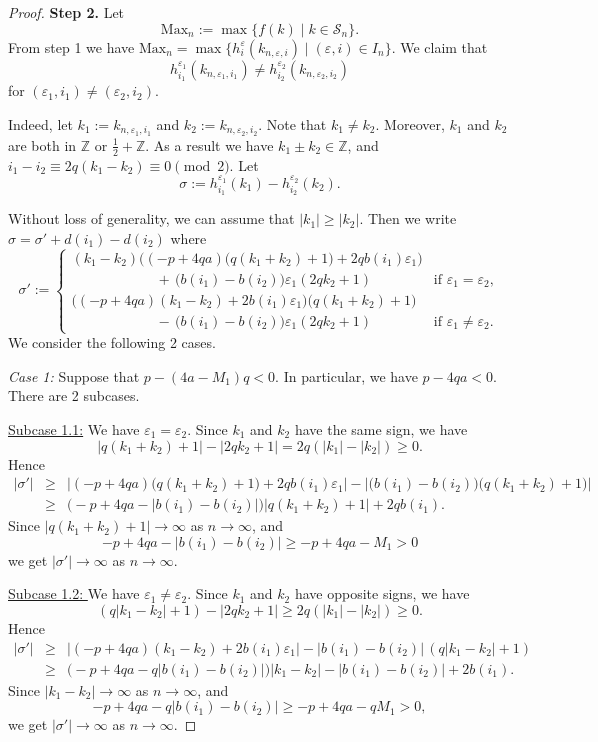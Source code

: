 \documentclass[11pt]{amsart}
\theoremstyle{definition}
\def\BZ{\mathbb Z}
\def\CS{\mathcal S}
\def\ve{\varepsilon}
\begin{document}
\begin{proof}
\textbf{Step 2.} Let 
$$\text{Max}_n := \max \{f(k) \mid k \in \CS_n\}.$$
From step 1 we have $\text{Max}_n =  \max \{ h_{i}^{\ve}(k_{n, \ve, i}) \mid (\ve, i) \in I_n \}.$ We claim that $$h_{i_1}^{\ve_1}(k_{n,\ve_1,i_1}) \not= h_{i_2}^{\ve_2}(k_{n,\ve_2,i_2})$$
for $(\ve_1,i_1) \not= (\ve_2,i_2)$. 

Indeed, let $k_1:=k_{n,\ve_1,i_1}$ and $k_2:=k_{n,\ve_2,i_2}$. Note that $k_1 \not= k_2$. Moreover, $k_1$ and $k_2$ are both in  $\BZ$ or $\frac{1}{2} + \BZ$. As a result we have $k_1 \pm  k_2 \in \BZ$, and $i_1 - i_2 \equiv 2q (k_1 - k_2) \equiv 0 \pmod{2}$. Let
$$\sigma := h_{i_1}^{\ve_1}(k_1) - h_{i_2}^{\ve_2}(k_2).$$

Without loss of generality, we can assume that $|k_1| \ge |k_2|$. Then we write $\sigma = \sigma' + d(i_1) - d(i_2)$ where
$$
\sigma' := \begin{cases} (k_1 - k_2) \Big( (-p+4qa) \big( q(k_1+k_2)+1 \big) + 2qb(i_1)\ve_1 \Big) \\ \qquad \qquad \qquad + \, \big( b(i_1) - b(i_2) \big) \ve_1 (2qk_2 + 1) &\mbox{if } \ve_1 = \ve_2, \\
\Big( (-p+4qa)(k_1 - k_2) + 2b(i_1)\ve_1 \Big) \big( q(k_1+k_2)+1 \big) 
\\ \qquad \qquad \qquad - \, \big( b(i_1) - b(i_2) \big) \ve_1 (2qk_2 + 1) &\mbox{if } \ve_1 \not= \ve_2.  \end{cases}
$$
We consider the following 2 cases.
\medskip

\textit{Case 1:} Suppose that $p - (4a - M_1)q <0 $. In particular, we have $p - 4qa <0$. There are 2 subcases.
\smallskip

\underline{Subcase 1.1:} We have $\ve_1 = \ve_2$. Since $k_1$ and $k_2$ have the same sign, we have 
$$|q(k_1+k_2)+1| - |2qk_2+1| = 2q (|k_1| - |k_2|) \ge 0.$$
Hence
\begin{eqnarray*}
|\sigma'| &\ge& \big| (-p+4qa) \big( q(k_1+k_2)+1 \big) + 2qb(i_1)\ve_1 \big| - \big| \big( b(i_1) - b(i_2) \big) \big( q(k_1+k_2)+1 \big) \big| \\
&\ge& \big( -p + 4qa - |b(i_1) - b(i_2)| \big) |q(k_1+k_2)+1| + 2q b(i_1).
\end{eqnarray*}
Since $|q(k_1+k_2)+1| \to \infty$ as $n \to \infty$, and $$-p + 4qa - |b(i_1) - b(i_2)| \ge -p + 4qa - M_1 >0$$ 
we get $|\sigma'| \to \infty$ as $n \to \infty.$

\smallskip

\underline{Subcase 1.2: } We have $\ve_1 \not= \ve_2$. Since $k_1$ and $k_2$ have opposite signs, we have 
$$(q|k_1-k_2| + 1) - |2qk_2+1| \ge 2q (|k_1| - |k_2|)  \ge 0.$$
Hence
\begin{eqnarray*}
|\sigma'| &\ge& \big|  (-p+4qa)(k_1 - k_2) + 2b(i_1)\ve_1 \big| -  | b(i_1) - b(i_2)| \, ( q|k_1 - k_2| + 1) \\
&\ge& \big( -p + 4qa - q |b(i_1) - b(i_2)| \big) |k_1 - k_2| -  | b(i_1) - b(i_2)|  + 2 b(i_1).
\end{eqnarray*}
Since $|k_1 - k_2| \to \infty$ as $n \to \infty$, and $$-p + 4qa - q |b(i_1) - b(i_2)| \ge -p + 4q a  - q M_1 >0,$$ we get $|\sigma'| \to \infty$ as $n \to \infty.$


\end{proof}
\end{document}

